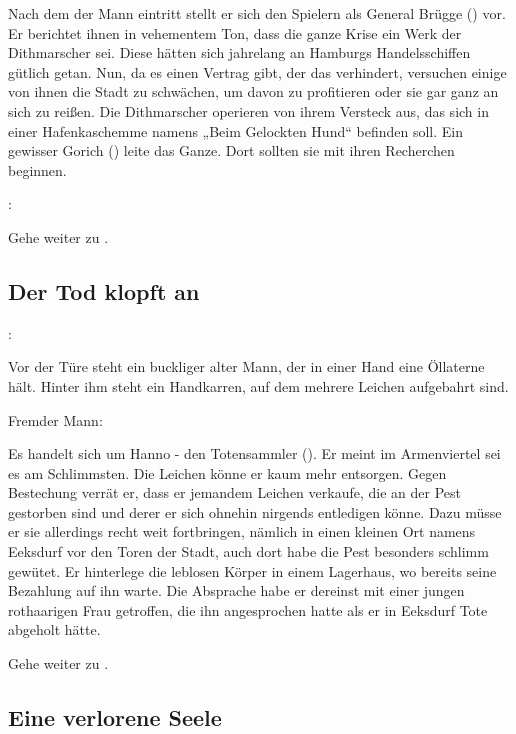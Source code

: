 Nach dem der Mann eintritt stellt er sich den Spielern als General Brügge (\blue{\ref{Brügge}}) vor. Er berichtet ihnen in vehementem Ton, dass die ganze Krise ein Werk der Dithmarscher sei. Diese hätten sich jahrelang an Hamburgs Handelsschiffen gütlich getan. Nun, da es einen Vertrag gibt, der das verhindert, versuchen einige von ihnen die Stadt zu schwächen, um davon zu profitieren oder sie gar ganz an sich zu reißen. Die Dithmarscher operieren von ihrem Versteck aus, das sich in einer Hafenkaschemme namens „Beim Gelockten Hund“ befinden soll. Ein gewisser Gorich (\blue{\ref{Gorich}}) leite das Ganze. Dort sollten sie mit ihren Recherchen beginnen.


:


Gehe weiter zu \blue{\ref{weiter}}.

\subsection{Der Tod klopft an}
\label{tot}

:

Vor der Türe steht ein buckliger alter Mann, der in einer Hand eine Öllaterne hält. Hinter ihm steht ein Handkarren, auf dem mehrere Leichen aufgebahrt sind.

Fremder Mann:

Es handelt sich um Hanno - den Totensammler (\blue{\ref{Hanno}}). Er meint im Armenviertel sei es am Schlimmsten. Die Leichen könne er kaum mehr entsorgen. Gegen Bestechung verrät er, dass er jemandem Leichen verkaufe, die an der Pest gestorben sind und derer er sich ohnehin nirgends entledigen könne. Dazu müsse er sie allerdings recht weit fortbringen, nämlich in einen kleinen Ort namens Eeksdurf vor den Toren der Stadt, auch dort habe die Pest besonders schlimm gewütet. Er hinterlege die leblosen Körper in einem Lagerhaus, wo bereits seine Bezahlung auf ihn warte. Die Absprache habe er dereinst mit einer jungen rothaarigen Frau getroffen, die ihn angesprochen hatte als er in Eeksdurf Tote abgeholt hätte.

Gehe weiter zu \blue{\ref{weiter}}.

\subsection{Eine verlorene Seele}
\label{kind}

